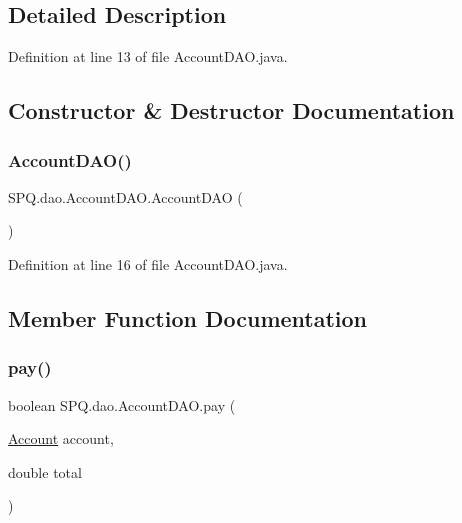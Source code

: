 \subsection{Detailed Description}


Definition at line 13 of file Account\+D\+A\+O.\+java.



\subsection{Constructor \& Destructor Documentation}
\mbox{\label{class_s_p_q_1_1dao_1_1_account_d_a_o_a8de4c4bcd808ea5ea2b9fdbc741e49ea}} 
\subsubsection{\texorpdfstring{Account\+D\+A\+O()}{AccountDAO()}}
{\footnotesize\ttfamily S\+P\+Q.\+dao.\+Account\+D\+A\+O.\+Account\+D\+AO (\begin{DoxyParamCaption}{ }\end{DoxyParamCaption})}



Definition at line 16 of file Account\+D\+A\+O.\+java.



\subsection{Member Function Documentation}
\mbox{\label{class_s_p_q_1_1dao_1_1_account_d_a_o_ad40cd6129f180d4cb235c00756b53930}} 
\subsubsection{\texorpdfstring{pay()}{pay()}}
{\footnotesize\ttfamily boolean S\+P\+Q.\+dao.\+Account\+D\+A\+O.\+pay (\begin{DoxyParamCaption}\item[{\mbox{\hyperlink{class_s_p_q_1_1data_1_1_account}{Account}}}]{account,  }\item[{double}]{total }\end{DoxyParamCaption})}



